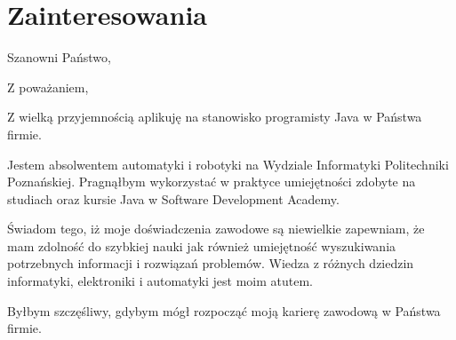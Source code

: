 \documentclass[12pt,a4paper,sans]{moderncv}
\begin{document}
\section{Zainteresowania}

\clearpage
\thispagestyle{empty}

\date{\today} %
\opening{Szanowni Państwo,} %
\closing{Z poważaniem,} %

\makelettertitle %

Z wielką przyjemnością aplikuję na stanowisko programisty Java w Państwa firmie.


Jestem absolwentem automatyki i robotyki na Wydziale Informatyki Politechniki Poznańskiej. Pragnąłbym wykorzystać w praktyce umiejętności zdobyte na studiach oraz kursie Java w Software Development Academy. 

Świadom tego, iż moje doświadczenia zawodowe są niewielkie zapewniam, że mam zdolność do szybkiej nauki jak również umiejętność wyszukiwania potrzebnych informacji i rozwiązań problemów. Wiedza z różnych dziedzin informatyki, elektroniki i automatyki jest moim atutem.

Byłbym szczęśliwy, gdybym mógł rozpocząć moją karierę zawodową w Państwa firmie.

\makeletterclosing %
\end{document}
